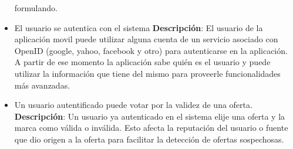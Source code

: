 \begin{itemize}
  formulando.
\item
  El usuario se autentica con el sistema \textbf{Descripción}: El
  usuario de la aplicación movil puede utilizar alguna cuenta de un
  servicio asociado con OpenID (google, yahoo, facebook y otro) para
  autenticarse en la aplicación. A partir de ese momento la aplicación
  sabe quién es el usuario y puede utilizar la información que tiene del
  mismo para proveerle funcionalidades más avanzadas.
\item
  Un usuario autentificado puede votar por la validez de una oferta.
  \textbf{Descripción}: Un usuario ya autenticado en el sistema elije
  una oferta y la marca como válida o inválida. Esto afecta la
  reputación del usuario o fuente que dio origen a la oferta para
  facilitar la detección de ofertas sospechosas.
\end{itemize}
